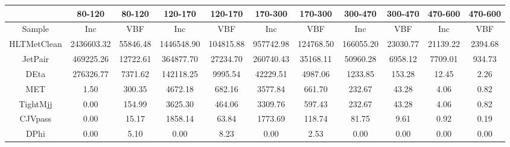 
\begin{tabular}{|c||cc||cc||cc||cc||cc|}
\hline
 & 80-120 & 80-120 & 120-170 & 120-170 & 170-300 & 170-300 & 300-470 & 300-470 & 470-600 & 470-600 \\
\hline
Sample & Inc & VBF & Inc & VBF & Inc & VBF & Inc & VBF & Inc & VBF \\
\hline \hline
HLTMetClean & 2436603.32 & 55846.48 & 1446548.90 & 104815.88 & 957742.98 & 124768.50 & 166055.20 & 23030.77 & 21139.22 & 2394.68 \\
JetPair & 469225.26 & 12722.61 & 364877.70 & 27234.70 & 260740.43 & 35168.11 & 50960.28 & 6958.12 & 7709.01 & 934.73 \\
DEta & 276326.77 & 7371.62 & 142118.25 & 9995.54 & 42229.51 & 4987.06 & 1233.85 & 153.28 & 12.45 & 2.26 \\
MET & 1.50 & 300.35 & 4672.18 & 682.16 & 3577.84 & 661.70 & 232.67 & 43.28 & 4.06 & 0.82 \\
TightMjj & 0.00 & 154.99 & 3625.30 & 464.06 & 3309.76 & 597.43 & 232.67 & 43.28 & 4.06 & 0.82 \\
CJVpass & 0.00 & 15.17 & 1858.14 & 63.84 & 1773.69 & 118.74 & 81.75 & 9.61 & 0.92 & 0.19 \\
DPhi & 0.00 & 5.10 & 0.00 & 8.23 & 0.00 & 2.53 & 0.00 & 0.00 & 0.00 & 0.00 \\
\hline
\end{tabular}

